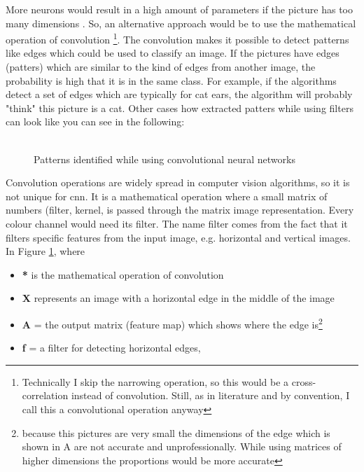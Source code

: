 More neurons would result in a high amount of parameters if the picture has too many dimensions \cite[p. 324]{Goodfellow-et-al-2016}. So, an alternative approach would be to use the mathematical operation of convolution \footnote{Technically I skip the narrowing operation, so this would be a cross-correlation instead of convolution. Still, as in literature and by convention, I call this a convolutional operation anyway\cite{AndrewNG}}. The convolution makes it possible to detect patterns like edges which could be used to classify an image. If the pictures have edges (patters) which are similar to the kind of edges from another image, the probability is high that it is in the same class. For example, if the algorithms detect a set of edges which are typically for cat ears, the algorithm will probably "think" this picture is a cat. Other cases how extracted patters while using filters can look like you can see in the following:\\\\
\begin{figure}[htp]
	\centering
	\caption{Patterns identified while using convolutional neural networks \cite{SimpleIn5:online}}
	\label{fig:edge_detec}
\end{figure}

Convolution operations are widely spread in computer vision algorithms, so it is not unique for \gls{cnn}. It is a mathematical operation where a small matrix of numbers (filter, kernel, is passed through the matrix image representation. Every colour channel would need its filter. The name filter comes from the fact that it filters specific features from the input image, e.g. horizontal and vertical images. In Figure \ref{fig:edge_detec}, where

\begin{itemize}
	\item \textbf{*} is the mathematical operation of convolution
	\item \textbf{X} represents an image with a horizontal edge in the middle of the image
	\item \textbf{A} = the output matrix (feature map) which shows where the edge is\footnote{because this pictures are very small the dimensions of the edge which is shown in A are not accurate and unprofessionally. While using matrices of higher dimensions the proportions would be more accurate}
	\item \textbf{f} = a filter for detecting horizontal edges,
\end{itemize}

